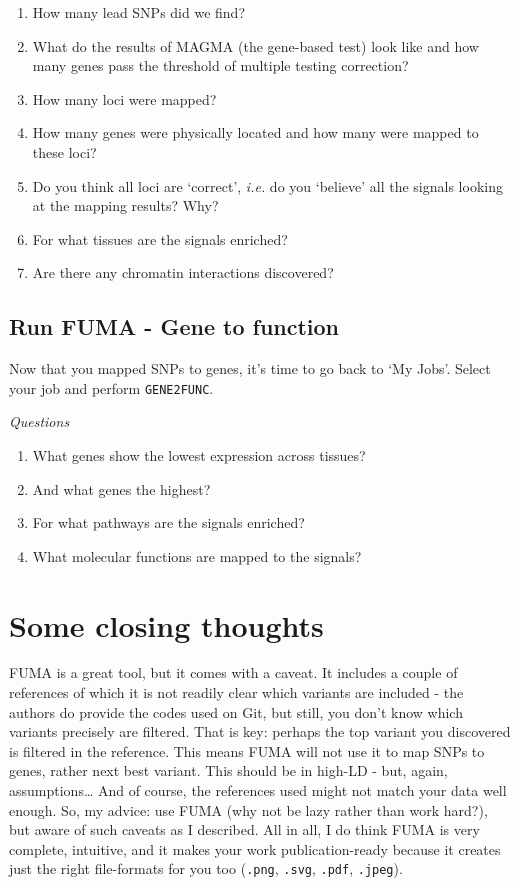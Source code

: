 \documentclass[
]{book}
\providecommand{\tightlist}{%
  \setlength{\itemsep}{0pt}\setlength{\parskip}{0pt}}
\begin{document}
\begin{enumerate}
\def\labelenumi{\arabic{enumi}.}
\tightlist
\item
  How many lead SNPs did we find?
\item
  What do the results of MAGMA (the gene-based test) look like and how many genes pass the threshold of multiple testing correction?
\item
  How many loci were mapped?
\item
  How many genes were physically located and how many were mapped to these loci?
\item
  Do you think all loci are `correct', \emph{i.e.} do you `believe' all the signals looking at the mapping results? Why?
\item
  For what tissues are the signals enriched?
\item
  Are there any chromatin interactions discovered?
\end{enumerate}

\hypertarget{run-fuma---gene-to-function}{%
\subsection{Run FUMA - Gene to function}\label{run-fuma---gene-to-function}}

Now that you mapped SNPs to genes, it's time to go back to `My Jobs'. Select your job and perform \texttt{GENE2FUNC}.

\emph{Questions}

\begin{enumerate}
\def\labelenumi{\arabic{enumi}.}
\tightlist
\item
  What genes show the lowest expression across tissues?
\item
  And what genes the highest?
\item
  For what pathways are the signals enriched?
\item
  What molecular functions are mapped to the signals?
\end{enumerate}

\hypertarget{some-closing-thoughts}{%
\section{Some closing thoughts}\label{some-closing-thoughts}}

FUMA is a great tool, but it comes with a caveat. It includes a couple of references of which it is not readily clear which variants are included - the authors do provide the codes used on Git, but still, you don't know which variants precisely are filtered. That is key: perhaps the top variant you discovered is filtered in the reference. This means FUMA will not use it to map SNPs to genes, rather next best variant. This should be in high-LD - but, again, assumptions\ldots{} And of course, the references used might not match your data well enough.
So, my advice: use FUMA (why not be lazy rather than work hard?), but aware of such caveats as I described. All in all, I do think FUMA is very complete, intuitive, and it makes your work publication-ready because it creates just the right file-formats for you too (\texttt{.png}, \texttt{.svg}, \texttt{.pdf}, \texttt{.jpeg}).
\end{document}
